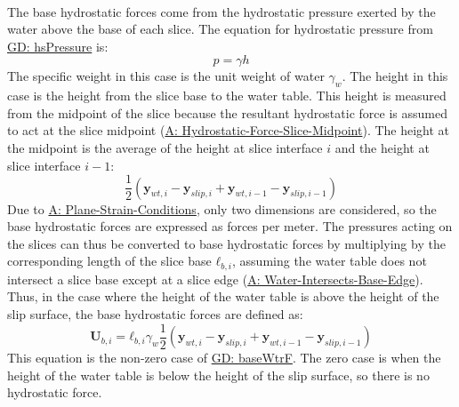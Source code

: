 \documentclass[12pt]{article}
\begin{document}
\paragraph{}
\label{GD:baseWtrFDeriv}
The base hydrostatic forces come from the hydrostatic pressure exerted by the water above the base of each slice. The equation for hydrostatic pressure from \hyperref[GD:hsPressure]{GD: hsPressure} is:
\begin{displaymath}
p=γ h
\end{displaymath}
The specific weight in this case is the unit weight of water ${γ_{w}}$. The height in this case is the height from the slice base to the water table. This height is measured from the midpoint of the slice because the resultant hydrostatic force is assumed to act at the slice midpoint (\hyperref[assumpHFSM]{A: Hydrostatic-Force-Slice-Midpoint}). The height at the midpoint is the average of the height at slice interface $i$ and the height at slice interface $i-1$:
\begin{displaymath}
\frac{1}{2} \left({\mathbf{y}_{wt,i}}-{\mathbf{y}_{slip,i}}+{\mathbf{y}_{wt,i-1}}-{\mathbf{y}_{slip,i-1}}\right)
\end{displaymath}
Due to \hyperref[assumpPSC]{A: Plane-Strain-Conditions}, only two dimensions are considered, so the base hydrostatic forces are expressed as forces per meter. The pressures acting on the slices can thus be converted to base hydrostatic forces by multiplying by the corresponding length of the slice base ${\mathbf{ℓ}_{b,i}}$, assuming the water table does not intersect a slice base except at a slice edge (\hyperref[assumpWIBE]{A: Water-Intersects-Base-Edge}). Thus, in the case where the height of the water table is above the height of the slip surface, the base hydrostatic forces are defined as:
\begin{displaymath}
{\mathbf{U}_{b,i}}={\mathbf{ℓ}_{b,i}} {γ_{w}} \frac{1}{2} \left({\mathbf{y}_{wt,i}}-{\mathbf{y}_{slip,i}}+{\mathbf{y}_{wt,i-1}}-{\mathbf{y}_{slip,i-1}}\right)
\end{displaymath}
This equation is the non-zero case of \hyperref[GD:baseWtrF]{GD: baseWtrF}. The zero case is when the height of the water table is below the height of the slip surface, so there is no hydrostatic force.
\par~
\end{document}
